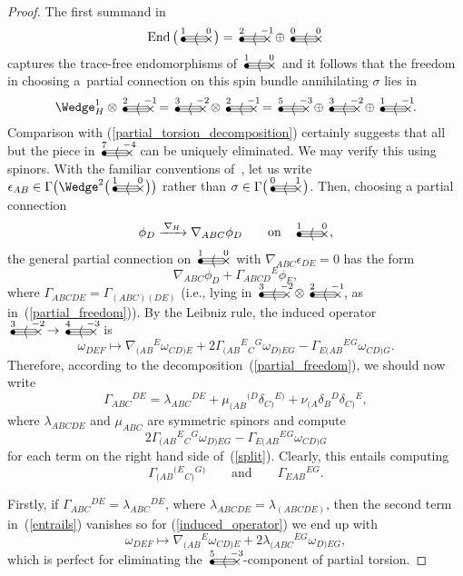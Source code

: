 \documentclass[10pt,a4paper]{amsart}
\numberwithin{equation}{section}
\newcommand{\End}{\operatorname{End}}
\newcommand{\gtwo}[2]{\begin{picture}(28,10)
\put(4,1.1){\makebox(0,0){$\bullet$}}
\put(24,1.5){\makebox(0,0){$\times$}}
\put(4,3.5){\line(1,0){18}}
\put(4,1.5){\line(1,0){20}}
\put(4,-.5){\line(1,0){18}}
\put(14,1.5){\makebox(0,0){$\langle$}}
\put(4,8){\makebox(0,0){$\scriptstyle #1$}}
\put(24,8){\makebox(0,0){$\scriptstyle #2$}}
\end{picture}}
\begin{document}
\begin{proof}
The first summand in
\[\End\big(\gtwo{1}{0}\big)=\gtwo{2}{-1}\oplus\gtwo{0}{0}\]
captures the trace-free endomorphisms of $\gtwo{1}{0}$ and it follows that the
freedom in choosing a~partial connection on this spin bundle annihilating
$\sigma$ lies in
\begin{equation}\label{partial_freedom}
\Wedge_H^1\otimes\gtwo{2}{-1}=\gtwo{3}{-2}\otimes\gtwo{2}{-1}
=\gtwo{5}{-3}\oplus\gtwo{3}{-2}\oplus\gtwo{1}{-1}.\end{equation}
Comparison with (\ref{partial_torsion_decomposition}) certainly suggests that
all but the piece in $\gtwo{7}{-4}$ can be uniquely eliminated. We may verify
this using spinors. With the familiar conventions of~\cite{OT}, let us write
$\epsilon_{AB}\in\Gamma\big({\Wedge}^2\big(\gtwo{1}{0}\big)\big)$ rather than
$\sigma\in\Gamma\big(\gtwo{0}{1}\big)$. Then,
choosing a partial connection
\[\phi_D\xrightarrow{\,\nabla_H\,}\nabla_{ABC}\phi_D\qquad\mbox{on} \quad
\gtwo{1}{0},\]
the general partial connection on $\gtwo{1}{0}$ with
$\nabla_{ABC}\epsilon_{DE}=0$ has the form
\[\nabla_{ABC}\phi_D+\Gamma_{ABCD}{}^E\phi_E,\]
where $\Gamma_{ABCDE}=\Gamma_{(ABC)(DE)}$ (i.e., lying in
$\gtwo{3}{-2}\otimes\gtwo{2}{-1}$, as in~(\ref{partial_freedom})). By the
Leibniz rule, the induced
operator $\gtwo{3}{-2}\to\gtwo{4}{-3}$ is
\begin{equation}\label{induced_operator}
\omega_{DEF}\longmapsto\nabla_{(AB}{}^E\omega_{CD)E}
+2\Gamma_{(AB}{}^E{}_C{}^G\omega_{D)EG}
-\Gamma_{E(AB}{}^E{}^G\omega_{CD)G}.\end{equation}
Therefore, according to the decomposition~(\ref{partial_freedom}), we should
now write
\begin{equation}\label{split}\Gamma_{ABC}{}^{DE}=\lambda_{ABC}{}^{DE}
+\mu_{(AB}{}^{(D}\delta_{C)}{}^{E)}
+\nu_{(A}\delta_B{}^D\delta_{C)}{}^E,\end{equation}
where $\lambda_{ABCDE}$ and $\mu_{ABC}$ are symmetric spinors and compute
\[2\Gamma_{(AB}{}^E{}_C{}^G\omega_{D)EG}
-\Gamma_{E(AB}{}^E{}^G\omega_{CD)G}\]
for each term on the right hand side of~(\ref{split}). Clearly, this entails
computing
\begin{equation}\label{entrails}
\Gamma_{(AB}{}^{(E}{}_{C)}{}^{G)}\qquad\mbox{and}\qquad
\Gamma_{EAB}{}^{EG}.\end{equation}

Firstly, if $\Gamma_{ABC}{}^{DE}=\lambda_{ABC}{}^{DE}$, where
$\lambda_{ABCDE}=\lambda_{(ABCDE)}$, then the second term in~(\ref{entrails})
vanishes so for (\ref{induced_operator}) we end up with
\[\omega_{DEF}\longmapsto\nabla_{(AB}{}^E\omega_{CD)E}
+2\lambda_{(ABC}{}^{EG}\omega_{D)EG},\]
which is perfect for eliminating the $\gtwo{5}{-3}$-component of partial
torsion.


\end{proof}
\end{document}

